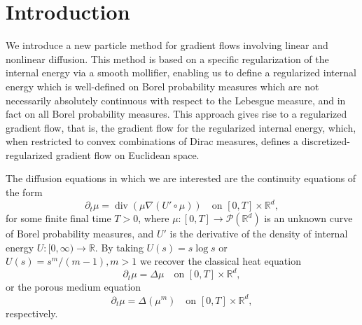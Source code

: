\documentclass[11pt,leqno]{amsart}
\theoremstyle{definition}
\newcommand{\be}{\begin{equation}}
\newcommand{\ee}{\end{equation}}
\newcommand{\bes}{\begin{equation*}}
\newcommand{\ees}{\end{equation*}}
\newcommand{\R}{{\mathord{\mathbb R}}}
\newcommand{\grad}{\nabla}
\def\P{{\mathcal P}}
\DeclareMathOperator{\dive}{div}
\begin{document}
\section{Introduction}
We introduce a new particle method for gradient flows involving linear and nonlinear diffusion. This method is based on a specific regularization of the internal energy via a smooth mollifier, enabling us to define a regularized internal energy which is well-defined on Borel probability measures which are not necessarily absolutely continuous with respect to the Lebesgue measure, and in fact on all Borel probability measures. This approach gives rise to a regularized gradient flow, that is, the gradient flow for the regularized internal energy, which, when restricted to convex combinations of Dirac measures, defines a discretized-regularized gradient flow on Euclidean space.

The diffusion equations in which we are interested are the continuity equations of the form
\be\label{eq:diffusion-general}
	\partial_t\mu = \dive (\mu \grad (U'\circ\mu)) \quad \mbox{on $[0,T]\times\R^d$},
\ee
for some finite final time $T>0$, where $\mu\colon [0,T] \to \P(\R^d)$ is an unknown curve of Borel probability measures, and $U'$ is the derivative of the density of internal energy $U \colon [0,\infty) \to \R$. By taking $U(s) = s\log s$ or $U(s) = s^m/(m-1), m>1$ we recover the classical heat equation
\bes
	\partial_t\mu = \Delta \mu \quad \mbox{on $[0,T]\times\R^d$},
\ees
or the porous medium equation
\bes
	\partial_t\mu = \Delta (\mu^m) \quad \mbox{on $[0,T]\times\R^d$},
\ees
respectively.
\end{document}
